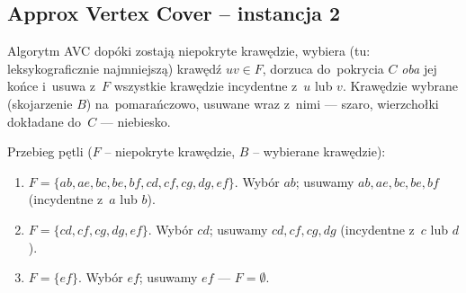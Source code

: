\subsection{Approx Vertex Cover -- instancja 2}

Algorytm \textsc{AVC} dopóki zostają niepokryte krawędzie, wybiera (tu:
leksykograficznie najmniejszą) krawędź $uv \in F$, dorzuca do~pokrycia $C$
\emph{oba} jej końce i~usuwa z~$F$ wszystkie krawędzie incydentne z~$u$ lub $v$.
Krawędzie wybrane (skojarzenie $B$) na~\textcolor{accentB}{pomarańczowo}, usuwane
wraz z~nimi --- szaro, wierzchołki dokładane do~$C$ --- niebiesko.

\newcommand{\vcnodesB}[7]{%
	\node[vcnodeB,#1] (a) at (0,2)    {$a$};
	\node[vcnodeB,#2] (b) at (1.5,2)  {$b$};
	\node[vcnodeB,#3] (c) at (3,2)    {$c$};
	\node[vcnodeB,#4] (d) at (4.5,2)  {$d$};
	\node[vcnodeB,#5] (e) at (0.75,0) {$e$};
	\node[vcnodeB,#6] (f) at (2.25,0) {$f$};
	\node[vcnodeB,#7] (g) at (3.75,0) {$g$};
}
\newcommand{\vcedgesBa}[5]{%
	\draw[#1] (a)--(b); \draw[#2] (b)--(c); \draw[#3] (c)--(d); \draw[#4] (a)--(e);
	\draw[#5] (b)--(e);}
\newcommand{\vcedgesBb}[5]{%
	\draw[#1] (b)--(f); \draw[#2] (c)--(f); \draw[#3] (c)--(g); \draw[#4] (d)--(g);
	\draw[#5] (e)--(f);}
\newcommand{\vcpanelB}[1]{%
	\begin{tikzpicture}[scale=0.55, baseline=(current bounding box.center)]#1\end{tikzpicture}}
\newcommand{\vclabelB}[1]{\node[font=\footnotesize] at (2.25,-0.9) {#1};}

\begin{dygresja}
	Przebieg pętli ($F$ -- niepokryte krawędzie, $B$ -- wybierane krawędzie):
	\begin{enumerate}[nosep]
		\item $F = \{ab, ae, bc, be, bf, cd, cf, cg, dg, ef\}$. Wybór $ab$; usuwamy
		      $ab, ae, bc, be, bf$ (incydentne z~$a$ lub $b$).
		\item $F = \{cd, cf, cg, dg, ef\}$. Wybór $cd$; usuwamy $cd, cf, cg, dg$
		      (incydentne z~$c$ lub $d$).
		\item $F = \{ef\}$. Wybór $ef$; usuwamy $ef$ --- $F = \emptyset$.
	\end{enumerate}
\end{dygresja}

